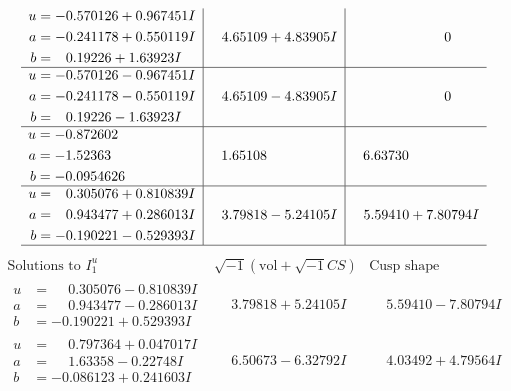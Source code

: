 \documentclass[1p]{elsarticle_modified}
\theoremstyle{definition}
\newcommand{\I}{\sqrt{-1}}
\begin{document}
$$\begin{array}{c|c|c}
\begin{aligned}
u &= -0.570126 + 0.967451 I \\
a &= -0.241178 + 0.550119 I \\
b &= \phantom{-}0.19226 + 1.63923 I\end{aligned}
 & \phantom{-}4.65109 + 4.83905 I & \phantom{-0.000000 } 0 \\ \hline\begin{aligned}
u &= -0.570126 - 0.967451 I \\
a &= -0.241178 - 0.550119 I \\
b &= \phantom{-}0.19226 - 1.63923 I\end{aligned}
 & \phantom{-}4.65109 - 4.83905 I & \phantom{-0.000000 } 0 \\ \hline\begin{aligned}
u &= -0.872602\phantom{ +0.000000I} \\
a &= -1.52363\phantom{ +0.000000I} \\
b &= -0.0954626\phantom{ +0.000000I}\end{aligned}
 & \phantom{-}1.65108\phantom{ +0.000000I} & \phantom{-}6.63730\phantom{ +0.000000I} \\ \hline\begin{aligned}
u &= \phantom{-}0.305076 + 0.810839 I \\
a &= \phantom{-}0.943477 + 0.286013 I \\
b &= -0.190221 - 0.529393 I\end{aligned}
 & \phantom{-}3.79818 - 5.24105 I & \phantom{-}5.59410 + 7.80794 I\\
 \hline 
 \end{array}$$\newpage$$\begin{array}{c|c|c}  
\text{Solutions to }I^u_{1}& \I (\text{vol} + \sqrt{-1}CS) & \text{Cusp shape}\\
 \hline 
\begin{aligned}
u &= \phantom{-}0.305076 - 0.810839 I \\
a &= \phantom{-}0.943477 - 0.286013 I \\
b &= -0.190221 + 0.529393 I\end{aligned}
 & \phantom{-}3.79818 + 5.24105 I & \phantom{-}5.59410 - 7.80794 I \\ \hline\begin{aligned}
u &= \phantom{-}0.797364 + 0.047017 I \\
a &= \phantom{-}1.63358 - 0.22748 I \\
b &= -0.086123 + 0.241603 I\end{aligned}
 & \phantom{-}6.50673 - 6.32792 I & \phantom{-}4.03492 + 4.79564 I \\ \hline\begin{aligned}

\end{aligned}
\end{array}$$
\end{document}
